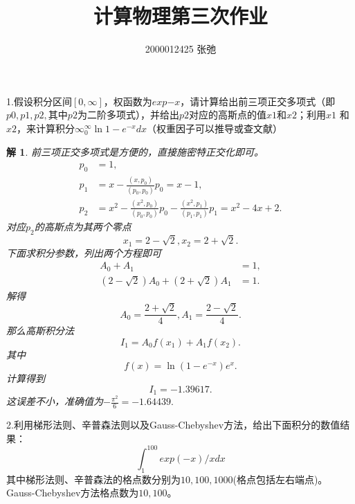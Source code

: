 \documentclass[10pt]{ctexart}
\author{2000012425 张弛}
\title{计算物理第三次作业}
\newtheorem*{solution}{解}
\begin{document}
\maketitle
1.假设积分区间$[0,\infty]$，权函数为$exp{-x}$，请计算给出前三项正交多项式（即
$p0,p1,p2,$其中$p2$为二阶多项式），并给出$p2$对应的高斯点的值$x1$和$x2$；利用$x1$
和$x2$，来计算积分$\infty_{0}^{\infty}\ln{1-e^{-x}}dx$（权重因子可以推导或查文献）
\begin{solution}
    前三项正交多项式是方便的，直接施密特正交化即可。
    \begin{align}
        p_0&=1,\nonumber\\
        p_1&=x-\frac{(x,p_0)}{(p_0,p_0)}p_0=x-1,\nonumber\\
        p_2&=x^2-\frac{(x^2,p_0)}{(p_0,p_0)}p_0-\frac{(x^2,p_1)}{(p_1,p_1)}p_1=x^2-4x+2.\nonumber
    \end{align}
    对应$p_2$的高斯点为其两个零点
    $$x_1=2-\sqrt{2},x_2=2+\sqrt{2}.$$
    下面求积分参数，列出两个方程即可
    \begin{align}
        A_0+A_1&=1,\nonumber\\
        (2-\sqrt{2})A_0+(2+\sqrt{2})A_1&=1.\nonumber
    \end{align}
    解得
    $$A_0=\frac{2+\sqrt{2}}{4},A_1=\frac{2-\sqrt{2}}{4}.$$
    那么高斯积分法
    $$I_1=A_0f(x_1)+A_1f(x_2).$$
    其中
    $$f(x)=\ln{(1-e^{-x})}e^x.$$
    计算得到
    $$I_1=-1.39617.$$
    这误差不小，准确值为$-\frac{\pi^2}{6}=-1.64439.$
\end{solution}
2.利用梯形法则、辛普森法则以及Gauss-Chebyshev方法，给出下面积分的数值结果：
$$\int_{1}^{100}exp(-x)/xdx $$
其中梯形法则、辛普森法的格点数分别为$10,100,1000$(格点包括左右端点)。Gauss-Chebyshev方法格点数为$10,100$。
\end{document}
